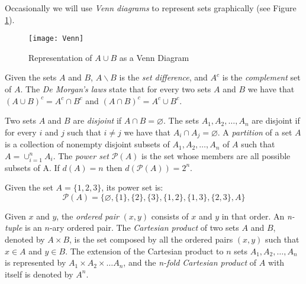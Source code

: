 Occasionally we will use \emph{Venn diagrams} to represent sets graphically (see Figure \ref{fig:Venn-diagram}).

\begin{figure}[h]
\centering\texttt{[image: Venn]}
\caption{\label{fig:Venn-diagram}Representation of $A \cup B$ as a Venn Diagram}
\end{figure}

Given the sets $A$ and $B$, $A \backslash B$ is the \emph{set difference}, and ${A}^c$ is the \emph{complement} set of $A$. The \emph{De Morgan's laws} state that for every two sets $A$ and $B$ we have that $\left( A \cup B \right)^c = A^c \cap B^c$ and $\left( A \cap B \right)^c = A^c \cup B^c$.

Two sets $A$ and $B$ are \emph{disjoint} if $A \cap B = \varnothing$. The sets $A_1, A_2, \ldots, A_n$ are disjoint if for every $i$ and $j$ such that $i \neq j$ we have that $A_i \cap A_j = \varnothing$. A \emph{partition} of a set $A$ is a collection of nonempty disjoint subsets of $A_1, A_2, \dots, A_n$ of $A$ such that  $A = \cup_{i=1}^n A_i$. The \emph{power set} $\mathcal{P}(A)$ is the set whose members are all possible subsets of A. If $d(A)=n$ then $d\left( \mathcal{P}(A) \right) = 2^n$.

\begin{example}
Given the set $A = \{1, 2, 3\}$, its power set is:
\[
\mathcal{P}(A) = \{\varnothing, \{1\}, \{2\}, \{3\}, \{1,2\}, \{1,3\}, \{2,3\}, A\}
\]
\end{example}


Given $x$ and $y$, the \emph{ordered pair} $\left(x, y\right)$ consists of $x$ and $y$ in that order. An \emph{n-tuple} is an $n$-ary ordered pair. The \emph{Cartesian product} of two sets $A$ and $B$, denoted by $A \times B$, is the set composed by all the ordered pairs $\left(x, y\right)$ such that $x \in A$ and $y \in B$. The extension of the Cartesian product to $n$ sets $A_1, A_2, \dots, A_n$ is represented by $A_1 \times A_2 \times \dots A_n$, and the \emph{n-fold Cartesian product} of $A$ with itself is denoted by $A^n$.

